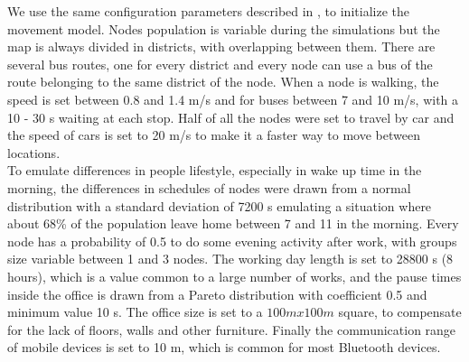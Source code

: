 We use the same configuration parameters described in \cite{articoloWdm}, to initialize the movement model. Nodes population is variable during the simulations but the map is always divided in districts, with overlapping between them. There are several bus routes, one for every district and every node can use a bus of the route belonging to the same district of the node. When a node is walking, the speed is set between 0.8 and 1.4 m/s and for buses between 7 and 10 m/s, with a 10 - 30 s waiting at each stop. Half of all the nodes were set to travel by car and the speed of cars is set to 20 m/s to make it a faster way to move between locations. 
\\

To emulate differences in people lifestyle, especially in wake up time in the morning, the differences in schedules of nodes were drawn from a normal distribution with a standard deviation of 7200 s emulating a situation where about 68\% of the population leave home between 7 and 11 in the morning. Every node has a probability of 0.5 to do some evening activity after work, with groups size variable between 1 and 3 nodes. The working day length is set to 28800 s (8 hours), which is a value common to a large number of works, and the pause times inside the office is drawn from a Pareto distribution with coefficient 0.5 and minimum value 10 s. The office size is set to a $100 m x 100 m$ square, to compensate for the lack of floors, walls and other furniture. Finally the communication range of mobile devices is set to 10 m, which is common for most Bluetooth devices.
\\

\newpage
